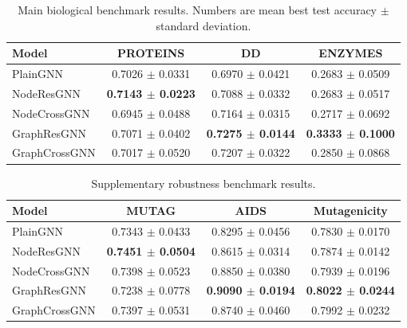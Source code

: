 \begin{table}[t]
\centering
\small
\caption{Main biological benchmark results. Numbers are mean best test accuracy $\pm$ standard deviation.}
\label{tab:all_results_1}
\begin{tabular}{lccc}
\toprule
Model & PROTEINS & DD & ENZYMES \\
\midrule
PlainGNN & 0.7026 $\pm$ 0.0331 & 0.6970 $\pm$ 0.0421 & 0.2683 $\pm$ 0.0509 \\
NodeResGNN & \textbf{0.7143 $\pm$ 0.0223} & 0.7088 $\pm$ 0.0332 & 0.2683 $\pm$ 0.0517 \\
NodeCrossGNN & 0.6945 $\pm$ 0.0488 & 0.7164 $\pm$ 0.0315 & 0.2717 $\pm$ 0.0692 \\
GraphResGNN & 0.7071 $\pm$ 0.0402 & \textbf{0.7275 $\pm$ 0.0144} & \textbf{0.3333 $\pm$ 0.1000} \\
GraphCrossGNN & 0.7017 $\pm$ 0.0520 & 0.7207 $\pm$ 0.0322 & 0.2850 $\pm$ 0.0868 \\
\bottomrule
\end{tabular}
\end{table}

\begin{table}[t]
\centering
\small
\caption{Supplementary robustness benchmark results.}
\label{tab:all_results_2}
\begin{tabular}{lccc}
\toprule
Model & MUTAG & AIDS & Mutagenicity \\
\midrule
PlainGNN & 0.7343 $\pm$ 0.0433 & 0.8295 $\pm$ 0.0456 & 0.7830 $\pm$ 0.0170 \\
NodeResGNN & \textbf{0.7451 $\pm$ 0.0504} & 0.8615 $\pm$ 0.0314 & 0.7874 $\pm$ 0.0142 \\
NodeCrossGNN & 0.7398 $\pm$ 0.0523 & 0.8850 $\pm$ 0.0380 & 0.7939 $\pm$ 0.0196 \\
GraphResGNN & 0.7238 $\pm$ 0.0778 & \textbf{0.9090 $\pm$ 0.0194} & \textbf{0.8022 $\pm$ 0.0244} \\
GraphCrossGNN & 0.7397 $\pm$ 0.0531 & 0.8740 $\pm$ 0.0460 & 0.7992 $\pm$ 0.0232 \\
\bottomrule
\end{tabular}
\end{table}

